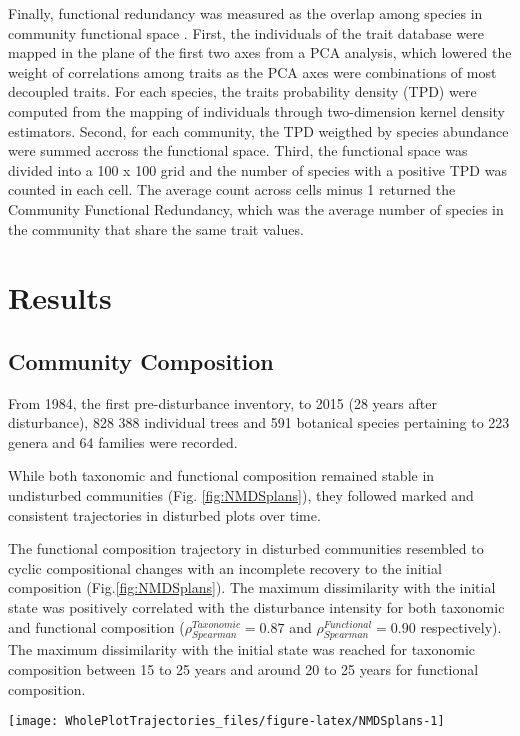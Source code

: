 \documentclass[fleqn,10pt]{ArtEcoFoG} %
\begin{document}
Finally, functional redundancy was measured as the overlap among species
in community functional space \citep{Carmona2016}. First, the
individuals of the trait database were mapped in the plane of the first
two axes from a PCA analysis, which lowered the weight of correlations
among traits as the PCA axes were combinations of most decoupled traits.
For each species, the traits probability density (TPD) were computed
from the mapping of individuals through two-dimension kernel density
estimators. Second, for each community, the TPD weigthed by species
abundance were summed accross the functional space. Third, the
functional space was divided into a 100 x 100 grid and the number of
species with a positive TPD was counted in each cell. The average count
across cells minus 1 returned the Community Functional Redundancy, which
was the average number of species in the community that share the same
trait values.

\section{Results}\label{results}

\subsection{Community Composition}\label{community-composition}

From 1984, the first pre-disturbance inventory, to 2015 (28 years after
disturbance), 828 388 individual trees and 591 botanical species
pertaining to 223 genera and 64 families were recorded.

While both taxonomic and functional composition remained stable in
undisturbed communities (Fig. \ref{fig:NMDSplans}), they followed marked
and consistent trajectories in disturbed plots over time.

The functional composition trajectory in disturbed communities resembled
to cyclic compositional changes with an incomplete recovery to the
initial composition (Fig.\ref{fig:NMDSplans}). The maximum dissimilarity
with the initial state was positively correlated with the disturbance
intensity for both taxonomic and functional composition
(\(\rho_{Spearman}^{Taxonomic}=0.87\) and
\(\rho_{Spearman}^{Functional}=0.90\) respectively). The maximum
dissimilarity with the initial state was reached for taxonomic
composition between 15 to 25 years and around 20 to 25 years for
functional composition.

\begin{figure*}

{\centering \texttt{[image: WholePlotTrajectories\_files/figure-latex/NMDSplans-1]} 

}

\caption{Plot trajectories in terms of taxonomic composition (\textbf{(a)} and \textbf{(c)}) and functional composition (\textbf{(b)} and \textbf{(d)}) in a two-dimensional NMDS plane. Lower panels (\textbf{(c)} and \textbf{(d)}) represent the Euclidean distance to initial condition along the 30 sampled years. Shaded areas are the credibility intervals.}\label{fig:NMDSplans}
\end{figure*}
\end{document}
